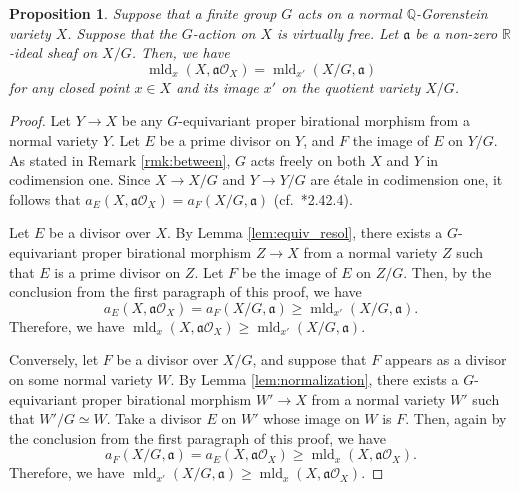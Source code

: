 \documentclass[a4paper,11pt]{amsart}
\newtheorem{prop}[thm]{Proposition}
\theoremstyle{definition}
\theoremstyle{remark}
\begin{document}
\begin{prop}\label{prop:eq}
Suppose that a finite group $G$ acts on a normal $\mathbb{Q}$-Gorenstein variety $X$. 
Suppose that the $G$-action on $X$ is virtually free. 
Let $\mathfrak{a}$ be a non-zero $\mathbb{R}$-ideal sheaf on $X/G$. 
Then, we have 
\[
\operatorname{mld}_{x}(X, \mathfrak{a}\mathcal{O}_X) = \operatorname{mld}_{x'}(X/G, \mathfrak{a})
\]
for any closed point $x \in X$ and its image $x'$ on the quotient variety $X/G$. 
\end{prop}
\begin{proof}
Let $Y \to X$ be any $G$-equivariant proper birational morphism from a normal variety $Y$. 
Let $E$ be a prime divisor on $Y$, and $F$ the image of $E$ on $Y/G$. 
As stated in Remark \ref{rmk:between}, $G$ acts freely on both $X$ and $Y$ in codimension one. 
Since $X \to X/G$ and $Y \to Y/G$ are \'{e}tale in codimension one, it follows that $a_E(X, \mathfrak{a}\mathcal{O}_X) = a_F(X/G, \mathfrak{a})$ (cf.\ \cite{Kol13}*{2.42.4}). 

Let $E$ be a divisor over $X$. 
By Lemma \ref{lem:equiv_resol}, there exists a $G$-equivariant proper birational morphism $Z \to X$ from a normal variety $Z$ such that $E$ is a prime divisor on $Z$. 
Let $F$ be the image of $E$ on $Z/G$. 
Then, by the conclusion from the first paragraph of this proof, we have 
\[
a_E (X, \mathfrak{a}\mathcal{O}_X) = a_F(X/G, \mathfrak{a}) \ge \operatorname{mld}_{x'}(X/G, \mathfrak{a}). 
\]
Therefore, we have $\operatorname{mld}_{x}(X, \mathfrak{a}\mathcal{O}_X) \ge \operatorname{mld}_{x'}(X/G, \mathfrak{a})$.



Conversely, let $F$ be a divisor over $X/G$, 
and suppose that $F$ appears as a divisor on some normal variety $W$. 
By Lemma \ref{lem:normalization}, there exists a $G$-equivariant proper birational morphism $W' \to X$ from a normal variety $W'$ such that $W'/G \simeq W$.
Take a divisor $E$ on $W'$ whose image on $W$ is $F$. 
Then, again by the conclusion from the first paragraph of this proof, we have 
\[
a_F(X/G, \mathfrak{a}) = a_E(X, \mathfrak{a}\mathcal{O}_X) \ge \operatorname{mld}_{x}(X, \mathfrak{a}\mathcal{O}_X). 
\]
Therefore, we have $\operatorname{mld}_{x'}(X/G, \mathfrak{a}) \ge \operatorname{mld}_{x}(X, \mathfrak{a}\mathcal{O}_X)$.
\end{proof}
\end{document}
